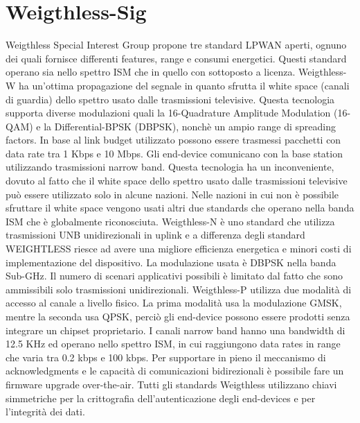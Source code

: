 \documentclass[12pt,a4paper,openright,twoside]{report}
\begin{document}
\section{Weigthless-Sig}
Weigthless Special Interest Group \cite{K10} 
 propone tre standard LPWAN aperti, ognuno dei quali fornisce differenti features, range e consumi energetici. Questi standard operano sia nello spettro ISM che in quello con sottoposto a licenza.  	
Weigthless-W ha un'ottima propagazione del segnale in quanto sfrutta il white space (canali di guardia) dello spettro usato  dalle trasmissioni televisive. Questa tecnologia supporta diverse modulazioni quali la 16-Quadrature Amplitude Modulation (16- QAM) e la Differential-BPSK (DBPSK), nonch\`e un ampio range di spreading factors. 
In base al link budget utilizzato possono essere trasmessi pacchetti con data rate tra 1 Kbps e 10 Mbps. Gli end-device comunicano con la base station utilizzando trasmissioni narrow band. Questa tecnologia ha un inconveniente, dovuto al fatto che il white space dello spettro usato dalle trasmissioni televisive pu\`o essere utilizzato solo in alcune nazioni. Nelle nazioni in cui non \`e possibile sfruttare il white space vengono usati altri due standards che operano nella banda ISM che \`e globalmente riconosciuta.  
Weigthless-N \`e uno standard che utilizza trasmissioni UNB unidirezionali in uplink e a differenza degli standard WEIGHTLESS riesce ad avere una migliore efficienza energetica e minori costi di implementazione del dispositivo. La modulazione usata \`e DBPSK nella banda Sub-GHz. Il numero di scenari applicativi possibili \`e limitato dal fatto che sono ammissibili solo trasmissioni unidirezionali.   
Weigthless-P utilizza due modalit\`a di accesso al canale a livello fisico. La prima modalit\`a usa la modulazione GMSK, mentre la seconda usa QPSK, perci\`o gli end-device possono essere prodotti senza integrare un chipset proprietario. I canali narrow band hanno una bandwidth di 12.5 KHz ed operano nello spettro ISM, in cui raggiungono data rates in range che varia tra 0.2 kbps e 100 kbps.
Per supportare in pieno il meccanismo di acknowledgments e le capacit\`a di comunicazioni bidirezionali \`e possibile fare un firmware upgrade over-the-air.       
Tutti gli standards Weigthless utilizzano chiavi simmetriche per la crittografia dell'autenticazione degli end-devices e per l'integrit\`a dei dati.
\end{document}

